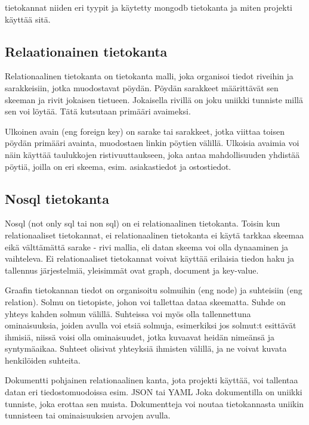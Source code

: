 

tietokannat niiden eri tyypit ja käytetty mongodb tietokanta ja miten projekti käyttää sitä.




\subsection*{Relaationainen tietokanta}


Relationaalinen tietokanta on tietokanta malli, joka organisoi tiedot riveihin ja sarakkeisiin, jotka muodostavat pöydän. 
Pöydän sarakkeet määrittävät sen skeeman ja rivit jokaisen tietueen.
Jokaisella rivillä on joku uniikki tunniste millä sen voi löytää. Tätä kutsutaan primääri avaimeksi.
\medskip

Ulkoinen avain (eng foreign key) on sarake tai sarakkeet, jotka viittaa toisen pöydän primääri avainta, muodostaen linkin pöytien välillä.
Ulkoisia avaimia voi näin käyttää taulukkojen ristivuuttaukseen, joka antaa mahdollisuuden yhdistää pöytiä, joilla on eri skeema, esim. asiakastiedot ja ostostiedot. 
\medskip


\medskip

\subsection*{Nosql tietokanta}


Nosql (not only sql tai non sql) on ei relationaalinen tietokanta.
Toisin kun relationaaliset tietokannat, ei relationaalinen tietokanta ei käytä tarkkaa skeemaa eikä välttämättä sarake - rivi mallia, eli datan skeema voi olla dynaaminen ja vaihteleva.
Ei relationaaliset tietokannat voivat käyttää erilaisia tiedon haku ja tallennus järjestelmiä, yleisimmät ovat graph, document ja key-value.
\medskip



Graafin tietokannan tiedot on organisoitu solmuihin (eng node) ja suhteisiin (eng relation).
Solmu on tietopiste, johon voi tallettaa dataa skeematta. 
Suhde on yhteys kahden solmun välillä. Suhteissa voi myös olla tallennettuna ominaisuuksia, joiden avulla voi etsiä solmuja,
esimerkiksi jos solmut:t esittävät ihmisiä, niissä voisi olla ominaisuudet, jotka kuvaavat heidän nimeänsä ja syntymäaikaa.
Suhteet olisivat yhteyksiä ihmisten välillä, ja ne voivat kuvata henkilöiden suhteita.
\medskip

Dokumentti pohjainen relationaalinen kanta, jota projekti käyttää, voi tallentaa datan eri tiedostomuodoissa esim. JSON tai YAML
Joka dokumentilla on uniikki tunniste, joka erottaa sen muista. 
Dokumentteja voi noutaa tietokannasta uniikin tunnisteen tai ominaisuuksien arvojen avulla.
\medskip

